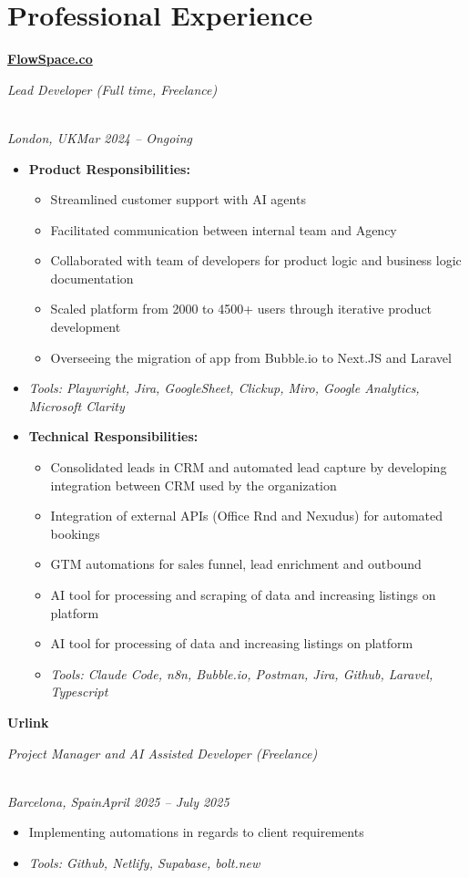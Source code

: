 \documentclass[a4paper,10pt]{article}
\newcommand{\role}[4]{\vspace{3pt}\noindent\hspace{0.6em}\parbox[t]{0.38\textwidth}{\raggedright\textbf{#1}}\hfill\parbox[t]{0.58\textwidth}{\raggedleft\textit{#2}}\\{\textit{#3}\hfill\textit{#4}}\vspace{1pt}}
\begin{document}
\section{Professional Experience}
\role{\href{https://flowspace.co}{FlowSpace.co}}{Lead Developer (Full time, Freelance)}{London, UK}{Mar 2024 -- Ongoing}
\begin{itemize}
\item \textbf{Product Responsibilities:}
\begin{itemize}[label=--]
\item Streamlined customer support with AI agents
\item Facilitated communication between internal team and Agency
\item Collaborated with team of developers for product logic and business logic documentation
\item Scaled platform from 2000 to 4500+ users through iterative product development
\item Overseeing the migration of app from Bubble.io to Next.JS and Laravel
\end{itemize}
\item \textit{Tools: Playwright, Jira, GoogleSheet, Clickup, Miro, Google Analytics, Microsoft Clarity}
\item \textbf{Technical Responsibilities:}
\begin{itemize}[label=--]
\item Consolidated leads in CRM and automated lead capture by developing integration between CRM used by the organization
\item Integration of external APIs (Office Rnd and Nexudus) for automated bookings
\item GTM automations for sales funnel, lead enrichment and outbound
\item AI tool for processing and scraping of data and increasing listings on platform
\item AI tool for processing of data and increasing listings on platform
\item \textit{Tools: Claude Code, n8n, Bubble.io, Postman, Jira, Github, Laravel, Typescript}
\end{itemize}
\end{itemize}

\role{Urlink}{Project Manager and AI Assisted Developer (Freelance)}{Barcelona, Spain}{April 2025 -- July 2025}
\begin{itemize}
\item Implementing automations in regards to client requirements
\item \textit{Tools: Github, Netlify, Supabase, bolt.new}
\end{itemize}
\end{document}
